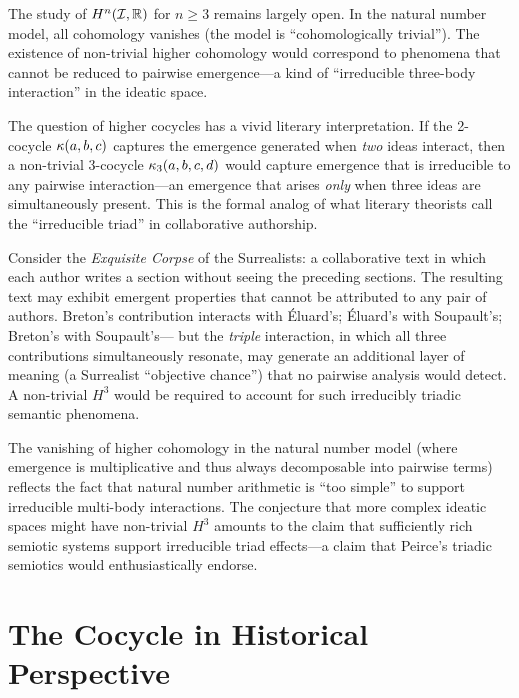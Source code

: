 \begin{remark}
The study of $H^n(\mathcal{I}, \mathbb{R})$ for $n \geq 3$ remains largely open. In
the natural number model, all cohomology vanishes (the model is
``cohomologically trivial''). The existence of non-trivial higher
cohomology would correspond to phenomena that cannot be reduced to
pairwise emergence---a kind of ``irreducible three-body interaction''
in the ideatic space.
\end{remark}

\begin{interpretation}\label{interp:ch2:higher_cocycles_collaboration}
The question of higher cocycles has a vivid literary interpretation.
If the 2-cocycle $\kappa(a, b, c)$ captures the emergence generated
when \emph{two} ideas interact, then a non-trivial 3-cocycle
$\kappa_3(a, b, c, d)$ would capture emergence that is irreducible to
any pairwise interaction---an emergence that arises \emph{only} when
three ideas are simultaneously present. This is the formal analog of
what literary theorists call the ``irreducible triad'' in collaborative
authorship.

Consider the \emph{Exquisite Corpse} of the Surrealists: a collaborative
text in which each author writes a section without seeing the preceding
sections. The resulting text may exhibit emergent properties that cannot
be attributed to any pair of authors. Breton's contribution interacts
with Éluard's; Éluard's with Soupault's; Breton's with Soupault's---
but the \emph{triple} interaction, in which all three contributions
simultaneously resonate, may generate an additional layer of meaning
(a Surrealist ``objective chance'') that no pairwise analysis would
detect. A non-trivial $H^3$ would be required to account for such
irreducibly triadic semantic phenomena.

The vanishing of higher cohomology in the natural number model (where
emergence is multiplicative and thus always decomposable into pairwise
terms) reflects the fact that natural number arithmetic is ``too simple''
to support irreducible multi-body interactions. The conjecture that more
complex ideatic spaces might have non-trivial $H^3$ amounts to the
claim that sufficiently rich semiotic systems support irreducible triad
effects---a claim that Peirce's triadic semiotics would enthusiastically
endorse.
\end{interpretation}

\section{The Cocycle in Historical Perspective}

